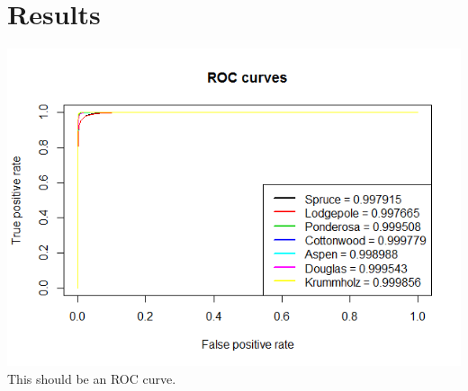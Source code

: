 \documentclass[11pt]{article}
\begin{document}
\section{Results}
\includegraphics[width=\linewidth]{images/RFROC.png}
This should be an ROC curve.
\end{document}
